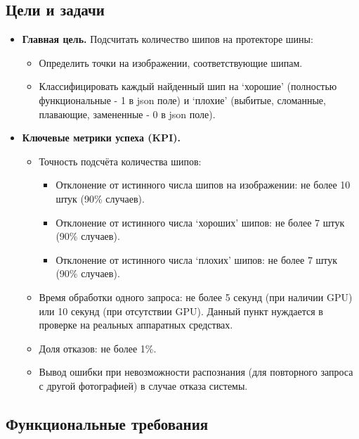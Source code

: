 \documentclass[12pt]{article}
\begin{document}
\subsection{Цели и задачи}
\begin{itemize}
	\item \textbf{Главная цель.} Подсчитать количество шипов на протекторе шины:
	      \begin{itemize}
		      \item Определить точки на изображении, соответствующие шипам.
		      \item Классифицировать каждый найденный шип на `хорошие' (полностью функциональные - 1 в json поле) и `плохие' (выбитые, сломанные, плавающие, замененные - 0 в json поле).
	      \end{itemize}
	\item \textbf{Ключевые метрики успеха (KPI).}
	      \begin{itemize}
		      \item Точность подсчёта количества шипов:
		            \begin{itemize}
			            \item Отклонение от истинного числа шипов на изображении: не более 10 штук (90\% случаев).
			            \item Отклонение от истинного числа `хороших' шипов: не более 7 штук (90\% случаев).
			            \item Отклонение от истинного числа `плохих' шипов: не более 7 штук (90\% случаев).
		            \end{itemize}
		      \item Время обработки одного запроса: не более 5 секунд (при наличии GPU) или 10 секунд (при отсутствии GPU). Данный пункт нуждается в проверке на реальных аппаратных средствах.
		      \item Доля отказов: не более 1\%.
		      \item Вывод ошибки при невозможности распознания (для повторного запроса с другой фотографией) в случае отказа системы.
	      \end{itemize}
\end{itemize}

\subsection{Функциональные требования}
\end{document}
